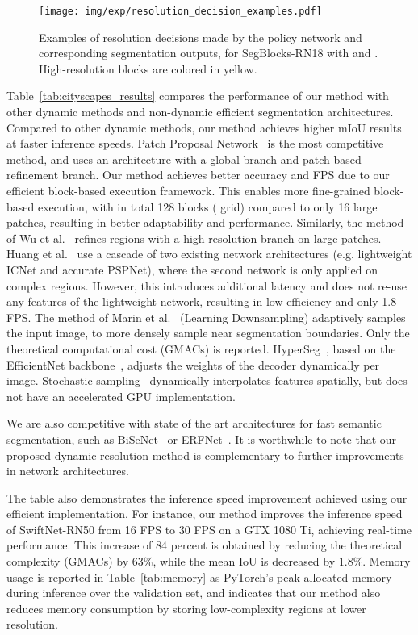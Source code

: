 \begin{figure*}[tb]
\centering
\texttt{[image: img/exp/resolution\_decision\_examples.pdf]}
\caption{Examples of resolution decisions made by the policy network and corresponding segmentation outputs, for SegBlocks-RN18 with  and . High-resolution blocks are colored in yellow. 
}
\label{fig:cityscapes_policy_examples}
\end{figure*}


Table~\ref{tab:cityscapes_results} compares the performance of our method with other dynamic methods and non-dynamic efficient segmentation architectures. Compared to other dynamic methods, our method achieves higher mIoU results at faster inference speeds. Patch Proposal Network~\cite{wu_patch_2020} is the most competitive method, and uses an architecture with a global branch and patch-based refinement branch. Our method achieves better accuracy and FPS due to our efficient block-based execution framework. This enables more fine-grained block-based execution, with in total 128 blocks ( grid) compared to only 16 large patches, resulting in better adaptability and performance. Similarly, the method of Wu et al.~\cite{wu_real-time_2017} refines regions with a high-resolution branch on large patches. Huang et al.~\cite{huang_uncertainty_2019} use a cascade of two existing network architectures (e.g. lightweight ICNet and accurate PSPNet), where the second network is only applied on complex regions. However, this introduces additional latency and does not re-use any features of the lightweight network, resulting in low efficiency and only 1.8 FPS. The method of Marin et al.~\cite{marin_efficient_2019} (Learning Downsampling) adaptively samples the input image, to more densely sample near segmentation boundaries. Only the theoretical computational cost (GMACs) is reported. HyperSeg~\cite{nirkin2021hyperseg}, based on the EfficientNet backbone~\cite{tan2019efficientnet}, adjusts the weights of the decoder dynamically per image. Stochastic sampling~\cite{xie_spatially_2020} dynamically interpolates features spatially, but does not have an accelerated GPU implementation.

We are also competitive with state of the art architectures for fast semantic segmentation, such as BiSeNet~\cite{ferrari_bisenet_2018} or ERFNet~\cite{romera_erfnet_2018}. It is worthwhile to note that our proposed dynamic resolution method is complementary to further improvements in network architectures.


The table also demonstrates the inference speed improvement achieved using our efficient implementation.
For instance, our method improves the inference speed of SwiftNet-RN50 from 16 FPS to 30 FPS on a GTX 1080 Ti, achieving real-time performance. This increase of 84 percent is obtained by reducing the theoretical complexity (GMACs) by 63\%,  while the mean IoU is decreased by 1.8\%.
Memory usage is reported in Table~\ref{tab:memory} as PyTorch's peak allocated memory during inference over the validation set, and indicates that our method also reduces memory consumption by storing low-complexity regions at lower resolution.

